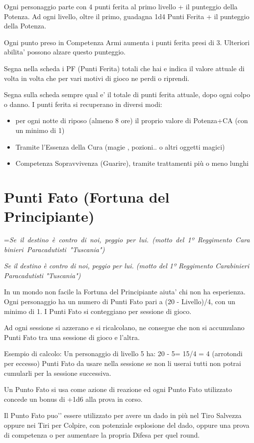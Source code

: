 \documentclass[a4paper,11pt,twoside,openany]{book}
\makeatletter
\newcommand{\mybox}[1]{%
	\setbox0=\hbox{#1}%
	\setlength{\@tempdima}{\dimexpr\wd0+13pt}%
	\begin{tcolorbox}[boxrule=0.5pt,arc=4pt, breakable,enhanced,
		left=6pt,right=6pt,top=6pt,bottom=6pt,boxsep=0pt,width=\@tempdima]
		#1
	\end{tcolorbox}
}
\makeatother
\begin{document}
Ogni personaggio parte con 4 punti ferita al primo livello + il punteggio della Potenza.
Ad ogni livello, oltre il primo, guadagna 1d4 Punti Ferita + il punteggio della Potenza. 

Ogni punto preso in Competenza Armi aumenta i punti ferita presi di 3. Ulteriori abilita’ possono alzare questo punteggio.

Segna nella scheda i PF (Punti Ferita) totali che hai e indica il valore attuale di volta in volta che per vari motivi di gioco ne perdi o riprendi.

Segna sulla scheda sempre qual e’ il totale di punti ferita attuale, dopo ogni colpo o danno.
I punti ferita si recuperano in diversi modi:

\begin{itemize}
\item 
per ogni notte di riposo (almeno 8 ore) il proprio valore di Potenza+CA (con un minimo di 1) 
\item
 Tramite l'Essenza della Cura (magie , pozioni.. o altri oggetti magici) 
\item 
Competenza Sopravvivenza (Guarire), tramite trattamenti più o meno lunghi 
\end{itemize}


\section{Punti Fato (Fortuna del Principiante)}
\mybox{\textit{Se il destino è contro di noi, peggio per lui. (motto del 1º Reggimento Carabinieri Paracadutisti "Tuscania")
}}\medskip

In un mondo non facile la Fortuna del Principiante aiuta’ chi non ha esperienza.
Ogni personaggio ha un numero di Punti Fato pari a (20 - Livello)/4, con un minimo di 1. I Punti Fato si conteggiano per sessione di gioco. 

Ad ogni sessione si azzerano e si ricalcolano, ne consegue che non si accumulano Punti Fato tra una sessione di gioco e l’altra.

Esempio di calcolo:
Un personaggio di livello 5 ha: 20 - 5= 15/4 = 4 (arrotondi per eccesso) Punti Fato da usare nella sessione se non li userai tutti non potrai cumularli per la sessione successiva.

Un Punto Fato si usa come azione di reazione ed ogni Punto Fato utilizzato concede un bonus di +1d6 alla prova in corso. 

Il Punto Fato puo'’ essere utilizzato per avere un dado in più nel Tiro Salvezza oppure nei Tiri per Colpire, con potenziale esplosione del dado, oppure una prova di competenza o per aumentare la propria Difesa per quel round.
\end{document}
